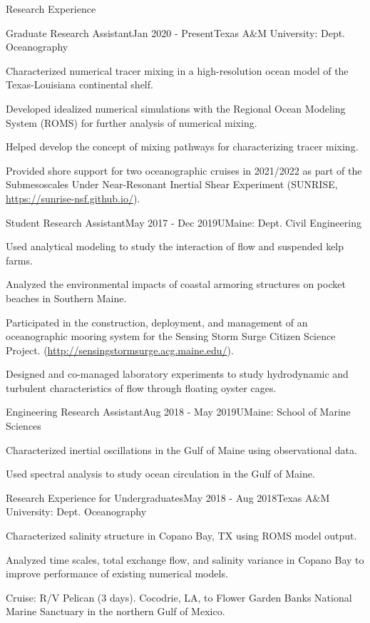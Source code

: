 \documentclass{resume} %
\begin{document}
\begin{rSection}{Research Experience}
\begin{rSubsection}{Graduate Research Assistant}{Jan 2020 - Present}{Texas A$\&$M University: Dept. Oceanography}{} 
\item Characterized numerical tracer mixing in a high-resolution ocean model of the Texas-Louisiana continental shelf.
\item Developed idealized numerical simulations with the Regional Ocean Modeling System (ROMS) for further analysis of numerical mixing.
\item Helped develop the concept of mixing pathways for characterizing tracer mixing.
\item Provided shore support for two oceanographic cruises in 2021/2022 as part of the Submesoscales Under Near-Resonant Inertial Shear Experiment (SUNRISE, \url{https://sunrise-nsf.github.io/}).
\end{rSubsection}    

\begin{rSubsection}{Student Research Assistant}{May 2017 - Dec 2019}{UMaine: Dept. Civil Engineering}{} 
\item Used analytical modeling to study the interaction of flow and suspended kelp farms.  
\item Analyzed the environmental impacts of coastal armoring structures on pocket beaches in Southern Maine.
\item Participated in the construction, deployment, and management of an oceanographic mooring system for the Sensing Storm Surge Citizen Science Project. (\url{http://sensingstormsurge.acg.maine.edu/}).
\item Designed and co-managed laboratory experiments to study hydrodynamic and turbulent characteristics of flow through floating oyster cages.
\end{rSubsection}

\begin{rSubsection}{Engineering Research Assistant}{Aug 2018 - May 2019}{UMaine: School of Marine Sciences}{}
\item Characterized inertial oscillations in the Gulf of Maine using observational data.
\item Used spectral analysis to study ocean circulation in the Gulf of Maine.
\end{rSubsection}

\begin{rSubsection}{Research Experience for Undergraduates}{May 2018 - Aug 2018}{Texas A$\&$M University: Dept. Oceanography}{} 
\item Characterized salinity structure in Copano Bay, TX using ROMS model output.
\item Analyzed time scales, total exchange flow, and salinity variance in Copano Bay to improve performance of existing numerical models.
\item Cruise: R/V Pelican (3 days). Cocodrie, LA, to Flower Garden Banks National Marine Sanctuary in the northern Gulf of Mexico.
\end{rSubsection} 
\end{rSection} 
\end{document}

